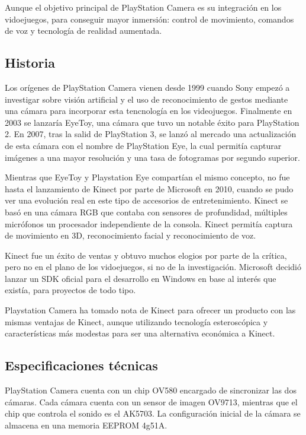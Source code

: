 Aunque el objetivo principal de PlayStation Camera es su integración en los
vidoejuegos, para conseguir mayor inmersión: control de movimiento, comandos de
voz y tecnología de realidad aumentada.

\subsection{Historia}
Los orígenes de PlayStation Camera vienen desde 1999 cuando Sony empezó a
investigar sobre visión artificial y el uso de reconocimiento de gestos mediante
una cámara para incorporar esta tencnología en los videojuegos. Finalmente en
2003 se lanzaría EyeToy, una cámara que tuvo un notable éxito para PlayStation
2. En 2007, tras la salid de PlayStation 3, se lanzó al mercado una
actualización de esta cámara con el nombre de PlayStation Eye, la cual permitía
capturar imágenes a una mayor resolución y una tasa de fotogramas por segundo
superior.

Mientras que EyeToy y Playstation Eye compartían el mismo concepto, no fue hasta
el lanzamiento de Kinect por parte de Microsoft en 2010, cuando se pudo ver una
evolución real en este tipo de accesorios de entretenimiento. Kinect se basó en
una cámara RGB que contaba con sensores de profundidad, múltiples micrófonos  un
procesador independiente de la consola. Kinect permitía captura de movimiento en
3D, reconocimiento facial y reconocimiento de voz.

Kinect fue un éxito de ventas y obtuvo muchos elogios por parte de la crítica,
pero no en el plano de los vidoejuegos, si no de la investigación. Microsoft
decidió lanzar un SDK oficial para el desarrollo en Windows en base al interés
que existía, para proyectos de todo tipo.

Playstation Camera ha tomado nota de Kinect para ofrecer un producto con las
mismas ventajas de Kinect, aunque utilizando tecnología esteroscópica y
características más modestas para ser una alternativa económica a Kinect.

\subsection{Especificaciones técnicas}

PlayStation Camera cuenta con un chip OV580 encargado de sincronizar las dos
cámaras. Cada cámara cuenta con un sensor de imagen OV9713, mientras que el chip
que controla el sonido es el AK5703. La configuración inicial de la cámara se
almacena en una memoria EEPROM 4g51A.

